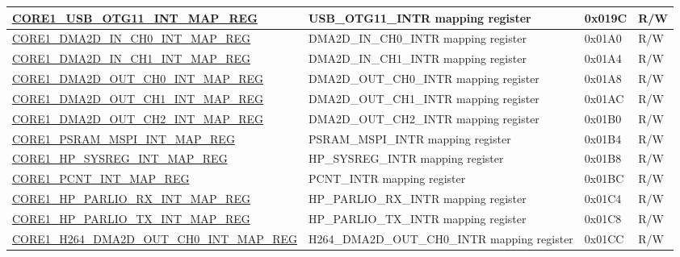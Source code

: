 \begin{longtable}{ | p{7.5cm} | p{7.2cm} | p{1.3cm} | p{1cm} | }
\hyperref[regdesc:CORE1USBOTG11INTMAPREG]{CORE1\_USB\_OTG11\_INT\_MAP\_REG} & USB\_OTG11\_INTR mapping register & 0x019C & R/W \\ \hline

\hyperref[regdesc:CORE1DMA2DINCH0INTMAPREG]{CORE1\_DMA2D\_IN\_CH0\_INT\_MAP\_REG} & DMA2D\_IN\_CH0\_INTR mapping register & 0x01A0 & R/W \\ \hline

\hyperref[regdesc:CORE1DMA2DINCH1INTMAPREG]{CORE1\_DMA2D\_IN\_CH1\_INT\_MAP\_REG} & DMA2D\_IN\_CH1\_INTR mapping register & 0x01A4 & R/W \\ \hline

\hyperref[regdesc:CORE1DMA2DOUTCH0INTMAPREG]{CORE1\_DMA2D\_OUT\_CH0\_INT\_MAP\_REG} & DMA2D\_OUT\_CH0\_INTR mapping register & 0x01A8 & R/W \\ \hline

\hyperref[regdesc:CORE1DMA2DOUTCH1INTMAPREG]{CORE1\_DMA2D\_OUT\_CH1\_INT\_MAP\_REG} & DMA2D\_OUT\_CH1\_INTR mapping register & 0x01AC & R/W \\ \hline

\hyperref[regdesc:CORE1DMA2DOUTCH2INTMAPREG]{CORE1\_DMA2D\_OUT\_CH2\_INT\_MAP\_REG} & DMA2D\_OUT\_CH2\_INTR mapping register & 0x01B0 & R/W \\ \hline

\hyperref[regdesc:CORE1PSRAMMSPIINTMAPREG]{CORE1\_PSRAM\_MSPI\_INT\_MAP\_REG} & PSRAM\_MSPI\_INTR mapping register & 0x01B4 & R/W \\ \hline

\hyperref[regdesc:CORE1HPSYSREGINTMAPREG]{CORE1\_HP\_SYSREG\_INT\_MAP\_REG} & HP\_SYSREG\_INTR mapping register & 0x01B8 & R/W \\ \hline

\hyperref[regdesc:CORE1PCNTINTMAPREG]{CORE1\_PCNT\_INT\_MAP\_REG} & PCNT\_INTR mapping register & 0x01BC & R/W \\ \hline

\hyperref[regdesc:CORE1HPPARLIORXINTMAPREG]{CORE1\_HP\_PARLIO\_RX\_INT\_MAP\_REG} & HP\_PARLIO\_RX\_INTR mapping register & 0x01C4 & R/W \\ \hline

\hyperref[regdesc:CORE1HPPARLIOTXINTMAPREG]{CORE1\_HP\_PARLIO\_TX\_INT\_MAP\_REG} & HP\_PARLIO\_TX\_INTR mapping register & 0x01C8 & R/W \\ \hline

\hyperref[regdesc:CORE1H264DMA2DOUTCH0INTMAPREG]{CORE1\_H264\_DMA2D\_OUT\_CH0\_INT\_MAP\_REG} & H264\_DMA2D\_OUT\_CH0\_INTR mapping register & 0x01CC & R/W \\ \hline


\end{longtable}
